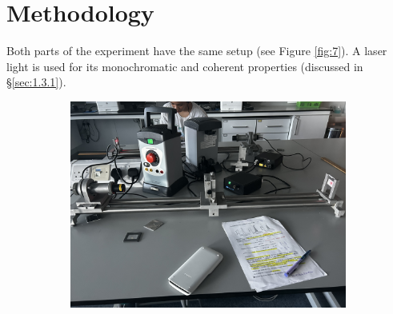 \documentclass[12pt]{article}
\begin{document}
\section{Methodology} \label{sec:2}

Both parts of the experiment have the same setup (see Figure \ref{fig:7}). A laser light is used for its monochromatic and coherent properties (discussed in §\ref{sec:1.3.1}).

\begin{figure}[H]
    \centering
    \begin{subfigure}[H]{.55\textwidth}
        \centering
        \includegraphics[width=\linewidth]{slits.jpeg}
    \end{subfigure}
    \hspace{-.5em}
    \begin{subfigure}[H]{.418\textwidth}
        \centering

\end{subfigure}
\end{figure}
\end{document}
